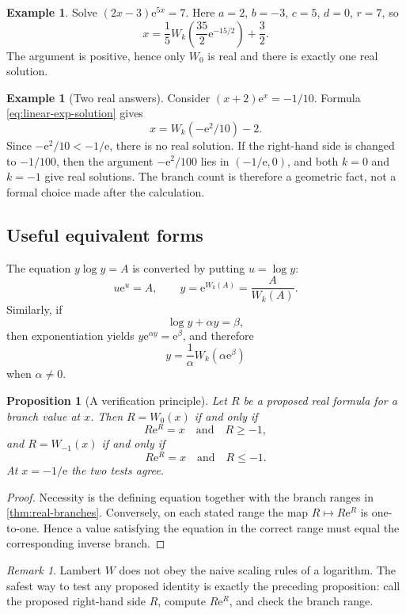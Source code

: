 \documentclass[11pt]{article}
\numberwithin{equation}{section}
\newtheorem{proposition}[theorem]{Proposition}
\theoremstyle{definition}
\newtheorem{example}[theorem]{Example}
\theoremstyle{remark}
\newtheorem{remark}[theorem]{Remark}
\newcommand{\e}{\mathrm e}
\begin{document}
\begin{example}
Solve $(2x-3)\e^{5x}=7$.  Here $a=2$, $b=-3$, $c=5$, $d=0$, $r=7$, so
\[
  x=\frac15W_k\!\left(\frac{35}{2}\e^{-15/2}\right)+\frac32.
\]
The argument is positive, hence only $W_0$ is real and there is exactly one
real solution.
\end{example}

\begin{example}[Two real answers]
Consider $(x+2)\e^x=-1/10$.  Formula
\eqref{eq:linear-exp-solution} gives
\[
  x=W_k(-\e^2/10)-2.
\]
Since $-\e^2/10<-1/\e$, there is no real solution.  If the right-hand side is
changed to $-1/100$, then the argument $-\e^2/100$ lies in $(-1/\e,0)$, and
both $k=0$ and $k=-1$ give real solutions.  The branch count is therefore a
geometric fact, not a formal choice made after the calculation.
\end{example}

\subsection{Useful equivalent forms}

The equation $y\log y=A$ is converted by putting $u=\log y$:
\[
  u\e^u=A,
  \qquad
  y=\e^{W_k(A)}=\frac{A}{W_k(A)}.
\]
Similarly, if
\[
  \log y+\alpha y=\beta,
\]
then exponentiation yields $y\e^{\alpha y}=\e^\beta$, and therefore
\begin{equation}
  y=\frac1\alpha W_k(\alpha\e^\beta)                 \label{eq:log-linear}
\end{equation}
when $\alpha\ne0$.

\begin{proposition}[A verification principle]
\label{prop:verification-principle}
Let $R$ be a proposed real formula for a branch value at $x$.
Then $R=W_0(x)$ if and only if
\[
  R\e^R=x\quad\text{and}\quad R\ge-1,
\]
and $R=W_{-1}(x)$ if and only if
\[
  R\e^R=x\quad\text{and}\quad R\le-1.
\]
At $x=-1/\e$ the two tests agree.
\end{proposition}

\begin{proof}
Necessity is the defining equation together with the branch ranges in
\cref{thm:real-branches}.  Conversely, on each stated range the map
$R\mapsto R\e^R$ is one-to-one.  Hence a value satisfying the equation in the
correct range must equal the corresponding inverse branch.
\end{proof}

\begin{remark}
Lambert $W$ does not obey the naive scaling rules of a logarithm.  The safest
way to test any proposed identity is exactly the preceding proposition: call
the proposed right-hand side $R$, compute $R\e^R$, and check the branch
range.
\end{remark}
\end{document}
